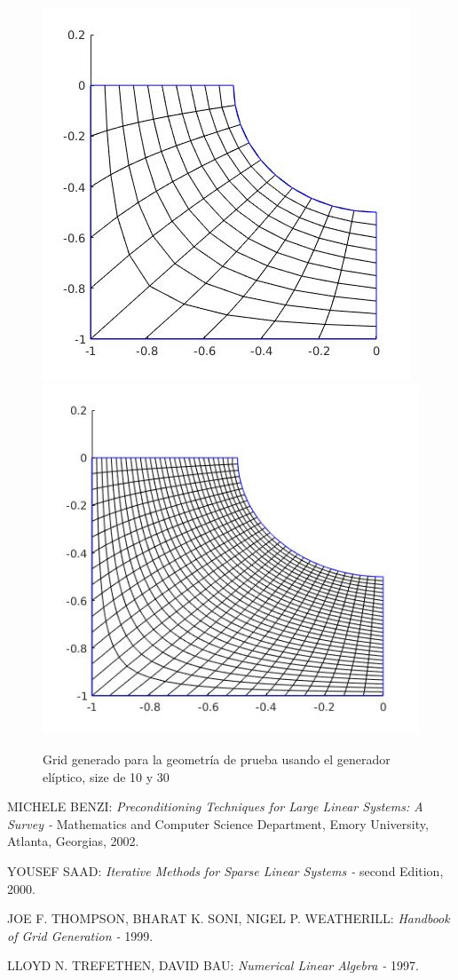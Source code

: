 \documentclass[11pt,letterpaper]{article}
\begin{document}
		\begin{figure}[H]
			\centering
			\includegraphics[scale=0.41]{./imgs/img_elliptic_generator_size_10.jpg}
			\includegraphics[scale=0.41]{./imgs/img_elliptic_generator_size_30.jpg}
			\caption{Grid generado para la geometr\'ia de prueba usando el generador el\'iptico, size de 10 y 30}
			\label{fig:img_grid_algebraic}
		\end{figure}
	

\clearpage
\begin{thebibliography}{10}
MICHELE BENZI:
\textit{Preconditioning Techniques for Large Linear
Systems: A Survey - }
Mathematics and Computer Science Department, Emory University, Atlanta, Georgias, 2002.
 
YOUSEF SAAD:
\textit{Iterative Methods for Sparse Linear Systems - } 
second Edition, 2000.
 
JOE F. THOMPSON, BHARAT K. SONI, NIGEL P. WEATHERILL:
\textit{Handbook of Grid Generation - }
1999.

LLOYD N. TREFETHEN, DAVID BAU:
\textit{Numerical Linear Algebra - }
1997.

\end{thebibliography}
\end{document}
